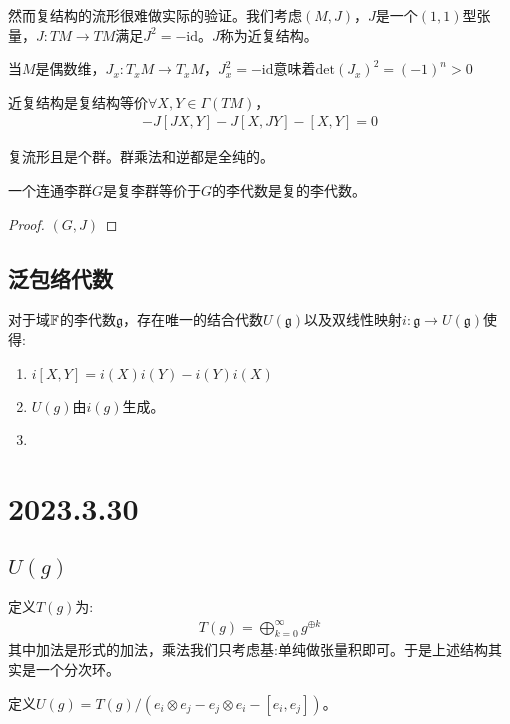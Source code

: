 然而复结构的流形很难做实际的验证。我们考虑$(M,J)$，$J$是一个$(1,1)$型张量，$J :TM \to TM$满足$J^2=-\mathrm{id}$。$J$称为近复结构。

当$M$是偶数维，$J_x:T_x M \to T_x M$，$J_x^2=-\mathrm{id}$意味着$\mathrm{det}(J_x)^2=(-1)^n>0$

近复结构是复结构等价$\forall X,Y \in \Gamma(TM)$，
\begin{align}
    [JX,JY]-J[JX,Y]-J[X,JY]-[X,Y]=0
\end{align}
\begin{definition}[复李群]
    复流形且是个群。群乘法和逆都是全纯的。
\end{definition}
\begin{theorem}
    一个连通李群$G$是复李群等价于$G$的李代数是复的李代数。
\end{theorem}
\begin{proof}
    $(G,J)$
\end{proof}

\section{泛包络代数}
对于域$\mathbb{F}$的李代数$\mathfrak{g}$，存在唯一的结合代数$U(\mathfrak{g})$以及双线性映射$i:\mathfrak{g}\to U(\mathfrak{g})$使得:
\begin{enumerate}
    \item $i[X,Y]=i(X)i(Y)-i(Y)i(X)$
    \item $U(g)$由$i(g)$生成。
    \item 
\end{enumerate}
\chapter{2023.3.30}
\section{$U(g)$}

定义$T(g)$为:
\begin{align}
    T(g)=\bigoplus_{k=0}^\infty g^{\oplus k}
\end{align}
其中加法是形式的加法，乘法我们只考虑基:单纯做张量积即可。于是上述结构其实是一个分次环。

定义$U(g)=T(g)/(e_i \otimes e_j-e_j \otimes e_i-[e_i,e_j])$。

